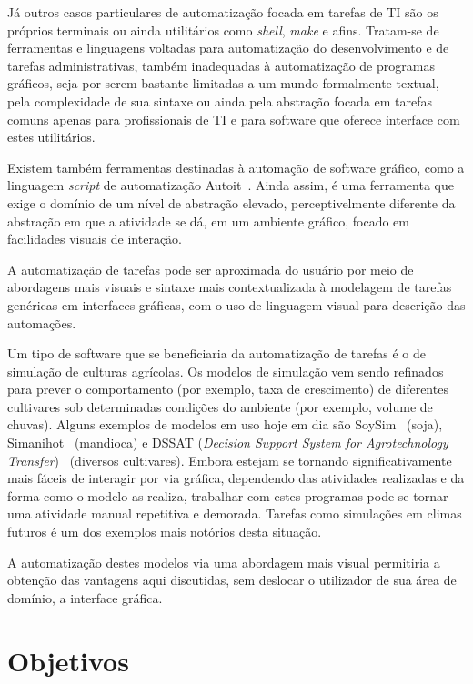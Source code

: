 \documentclass[12pt]{article}
\begin{document}
Já outros casos particulares de automatização focada em tarefas de TI são os próprios terminais ou ainda utilitários como \emph{shell},  \emph{make} e afins. Tratam-se de ferramentas e linguagens voltadas para automatização do desenvolvimento e de tarefas administrativas, também inadequadas à automatização de programas gráficos, seja por serem bastante limitadas a um mundo formalmente textual, pela complexidade de sua sintaxe ou ainda pela abstração focada em tarefas comuns apenas para profissionais de TI e para software que oferece interface com estes utilitários.

Existem também ferramentas destinadas à automação de software gráfico, como a linguagem \emph{script} de automatização Autoit~\cite{autoit}. Ainda assim, é uma ferramenta que exige o domínio de um nível de abstração elevado, perceptivelmente diferente da abstração em que a atividade se dá, em um ambiente gráfico, focado em facilidades visuais de interação.

A automatização de tarefas pode ser aproximada do usuário por meio de abordagens mais visuais e sintaxe mais contextualizada à modelagem de tarefas genéricas em interfaces gráficas, com o uso de linguagem visual para descrição das automações.

Um tipo de software que se beneficiaria da automatização de tarefas é o de simulação de culturas agrícolas. Os modelos de simulação vem sendo refinados para prever o comportamento (por exemplo, taxa de crescimento) de diferentes cultivares sob determinadas condições do ambiente (por exemplo, volume de chuvas). Alguns exemplos de modelos em uso hoje em dia são SoySim~\cite{SoySim} (soja), Simanihot~\cite{Simanihot} (mandioca) e DSSAT (\emph{Decision Support System for Agrotechnology Transfer})~\cite{dssat} (diversos cultivares). Embora estejam se tornando significativamente mais fáceis de interagir por via gráfica, dependendo das atividades realizadas e da forma como o modelo as realiza, trabalhar com estes programas pode se tornar uma atividade manual repetitiva e demorada. Tarefas como simulações em climas futuros é um dos exemplos mais notórios desta situação.

A automatização destes modelos via uma abordagem mais visual permitiria a obtenção das vantagens aqui discutidas, sem deslocar o utilizador de sua área de domínio, a interface gráfica. 
	
	\section{Objetivos}
	
\end{document}
